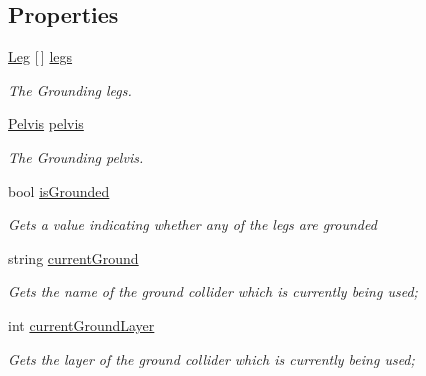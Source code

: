 \subsection*{Properties}
\begin{DoxyCompactItemize}
\item 
\mbox{\hyperlink{class_root_motion_1_1_final_i_k_1_1_grounding_1_1_leg}{Leg}} \mbox{[}$\,$\mbox{]} \mbox{\hyperlink{class_root_motion_1_1_final_i_k_1_1_grounding_a5094343c180bdd488e9b9b407bf8953f}{legs}}
\begin{DoxyCompactList}\small\item\em The Grounding legs. \end{DoxyCompactList}\item 
\mbox{\hyperlink{class_root_motion_1_1_final_i_k_1_1_grounding_1_1_pelvis}{Pelvis}} \mbox{\hyperlink{class_root_motion_1_1_final_i_k_1_1_grounding_a7a2c4ae7c110994b8990ee7e2eb8d68b}{pelvis}}
\begin{DoxyCompactList}\small\item\em The Grounding pelvis. \end{DoxyCompactList}\item 
bool \mbox{\hyperlink{class_root_motion_1_1_final_i_k_1_1_grounding_a02b57261b10e29f2a4aade9940aae54c}{is\+Grounded}}
\begin{DoxyCompactList}\small\item\em Gets a value indicating whether any of the legs are grounded \end{DoxyCompactList}\item 
string \mbox{\hyperlink{class_root_motion_1_1_final_i_k_1_1_grounding_a562a705694c04cf683d852ce2cceb933}{current\+Ground}}
\begin{DoxyCompactList}\small\item\em Gets the name of the ground collider which is currently being used; \end{DoxyCompactList}\item 
int \mbox{\hyperlink{class_root_motion_1_1_final_i_k_1_1_grounding_afce4d1661a130a07c69e06e08bfb5947}{current\+Ground\+Layer}}
\begin{DoxyCompactList}\small\item\em Gets the layer of the ground collider which is currently being used; \end{DoxyCompactList}\item 

\end{DoxyCompactItemize}
